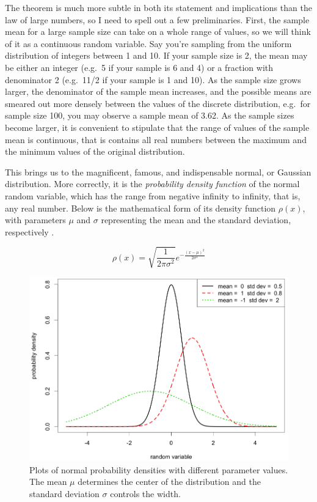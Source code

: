 \documentclass[
]{book}
\theoremstyle{definition}
\theoremstyle{definition}
\theoremstyle{definition}
\theoremstyle{remark}
\begin{document}
The theorem is much more subtle in both its statement and implications than the law of large numbers, so I need to spell out a few preliminaries. First, the sample mean for a large sample size can take on a whole range of values, so we will think of it as a continuous random variable. Say you're sampling from the uniform distribution of integers between 1 and 10. If your sample size is 2, the mean may be either an integer (e.g.~5 if your sample is 6 and 4) or a fraction with denominator 2 (e.g.~11/2 if your sample is 1 and 10). As the sample size grows larger, the denominator of the sample mean increases, and the possible means are smeared out more densely between the values of the discrete distribution, e.g.~for sample size 100, you may observe a sample mean of 3.62. As the sample sizes become larger, it is convenient to stipulate that the range of values of the sample mean is continuous, that is contains all real numbers between the maximum and the minimum values of the original distribution.

This brings us to the magnificent, famous, and indispensable normal, or Gaussian distribution. More correctly, it is the \emph{probability density function} of the normal random variable, which has the range from negative infinity to infinity, that is, any real number. Below is the mathematical form of its density function \(\rho(x)\), with parameters \(\mu\) and \(\sigma\) representing the mean and the standard deviation, respectively \citep{whitlock_analysis_2008}.

\[\rho(x) = \sqrt{\frac{1}{2\pi \sigma^2}} e^{-\frac{(x-\mu)^2}{2 \sigma^2}}\]

\begin{figure}
\centering
\includegraphics{ch5/normal_dist_example.png}
\caption{Plots of normal probability densities with different parameter values. The mean \(\mu\) determines the center of the distribution and the standard deviation \(\sigma\) controls the width.}
\end{figure}
\end{document}
